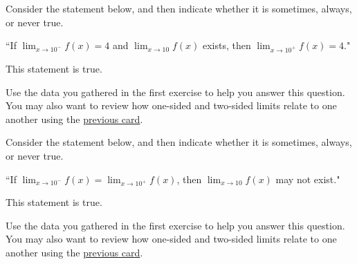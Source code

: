\documentclass[handout]{ximera}
\begin{document}
\begin{exercise}

Consider the statement below, and then indicate whether it is sometimes, always, or never true.

``If $\displaystyle\lim_{x\to 10^-} f(x) = 4$ and $\displaystyle\lim_{x\to 10} f(x)$ exists, then $\displaystyle\lim_{x\to 10^+} f(x) = 4.$"

This statement is  true.

\begin{hint}

Use the data you gathered in the first exercise to help you answer this question.  You may also want to review how one-sided and two-sided limits relate to one another using the  \href{https://ximera.osu.edu/math160fa17/m160exam1content/whatIsALimit/digInWhatIsALimit}{previous card}.
\end{hint}

\end{exercise}

\begin{exercise}

Consider the statement below, and then indicate whether it is sometimes, always, or never true.

``If $\displaystyle\lim_{x\to 10^-} f(x) = \displaystyle\lim_{x\to 10^+} f(x)$, then $\displaystyle\lim_{x\to 10} f(x)$ may not exist."

This statement is  true.

\begin{hint}

Use the data you gathered in the first exercise to help you answer this question.  You may also want to review how one-sided and two-sided limits relate to one another using the \href{https://ximera.osu.edu/math160fa17/m160exam1content/whatIsALimit/digInWhatIsALimit}{previous card}.

\end{hint} 

\end{exercise}
\end{document}
